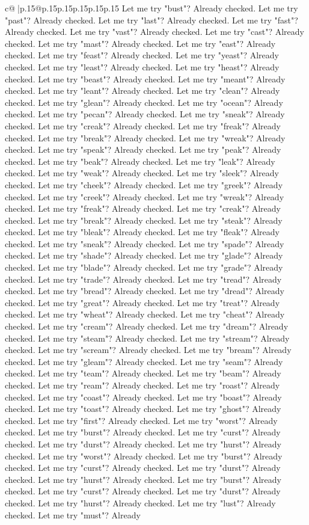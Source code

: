 \documentclass{article}
\begin{document}
{\begin{supertabular}{c@{$\;$}|p{.15\linewidth}@{}p{.15\linewidth}p{.15\linewidth}p{.15\linewidth}p{.15\linewidth}p{.15\linewidth}}
{{{Let me try "bust"? Already checked. Let me try "past"? Already checked. Let me try "last"? Already checked. Let me try "fast"? Already checked. Let me try "vast"? Already checked. Let me try "cast"? Already checked. Let me try "mast"? Already checked. Let me try "east"? Already checked. Let me try "feast"? Already checked. Let me try "yeast"? Already checked. Let me try "least"? Already checked. Let me try "heast"? Already checked. Let me try "beast"? Already checked. Let me try "meant"? Already checked. Let me try "leant"? Already checked. Let me try "clean"? Already checked. Let me try "glean"? Already checked. Let me try "ocean"? Already checked. Let me try "pecan"? Already checked. Let me try "sneak"? Already checked. Let me try "creak"? Already checked. Let me try "freak"? Already checked. Let me try "break"? Already checked. Let me try "wreak"? Already checked. Let me try "speak"? Already checked. Let me try "peak"? Already checked. Let me try "beak"? Already checked. Let me try "leak"? Already checked. Let me try "weak"? Already checked. Let me try "sleek"? Already checked. Let me try "cheek"? Already checked. Let me try "greek"? Already checked. Let me try "creek"? Already checked. Let me try "wreak"? Already checked. Let me try "freak"? Already checked. Let me try "creak"? Already checked. Let me try "break"? Already checked. Let me try "steak"? Already checked. Let me try "bleak"? Already checked. Let me try "fleak"? Already checked. Let me try "sneak"? Already checked. Let me try "spade"? Already checked. Let me try "shade"? Already checked. Let me try "glade"? Already checked. Let me try "blade"? Already checked. Let me try "grade"? Already checked. Let me try "trade"? Already checked. Let me try "tread"? Already checked. Let me try "bread"? Already checked. Let me try "dread"? Already checked. Let me try "great"? Already checked. Let me try "treat"? Already checked. Let me try "wheat"? Already checked. Let me try "cheat"? Already checked. Let me try "cream"? Already checked. Let me try "dream"? Already checked. Let me try "steam"? Already checked. Let me try "stream"? Already checked. Let me try "scream"? Already checked. Let me try "bream"? Already checked. Let me try "gleam"? Already checked. Let me try "seam"? Already checked. Let me try "team"? Already checked. Let me try "beam"? Already checked. Let me try "ream"? Already checked. Let me try "roast"? Already checked. Let me try "coast"? Already checked. Let me try "boast"? Already checked. Let me try "toast"? Already checked. Let me try "ghost"? Already checked. Let me try "first"? Already checked. Let me try "worst"? Already checked. Let me try "burst"? Already checked. Let me try "curst"? Already checked. Let me try "durst"? Already checked. Let me try "hurst"? Already checked. Let me try "worst"? Already checked. Let me try "burst"? Already checked. Let me try "curst"? Already checked. Let me try "durst"? Already checked. Let me try "hurst"? Already checked. Let me try "burst"? Already checked. Let me try "curst"? Already checked. Let me try "durst"? Already checked. Let me try "hurst"? Already checked. Let me try "lust"? Already checked. Let me try "must"? Already }}}
\end{supertabular}}
\end{document}
